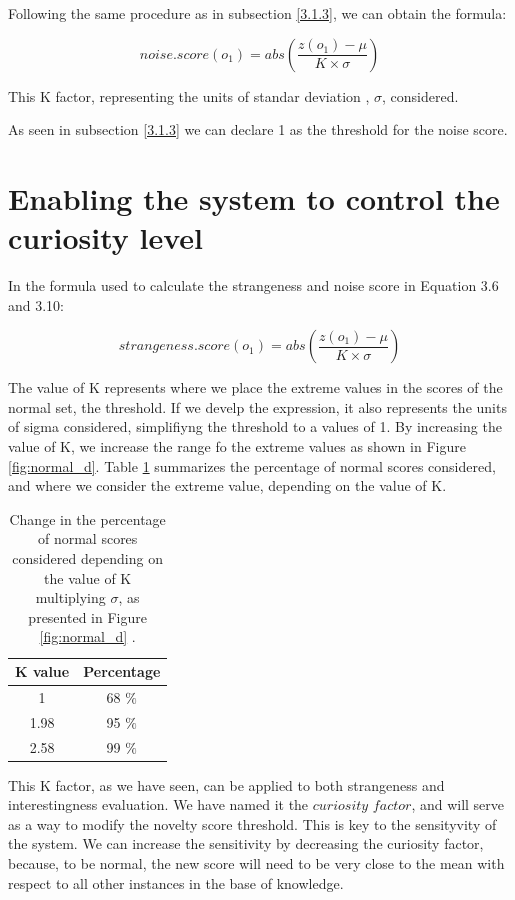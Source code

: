 Following the same procedure as in subsection \ref{3.1.3}, we can obtain the formula:

\begin{equation}
noise.score(o_1) = abs( \dfrac{z(o_1) - \mu}{ K \times \sigma})
\end{equation}

This K factor, representing the units of standar deviation , $\sigma$, considered.

As seen in subsection \ref{3.1.3} we can declare 1 as the threshold for the noise score.

\section{Enabling the system to control the curiosity level} \label{3.3}

In the formula used to calculate the strangeness and noise score in Equation 3.6 and 3.10:

\begin{equation}
strangeness.score(o_1) = abs( \dfrac{z(o_1) - \mu}{ K \times \sigma})
\end{equation}

The value of K represents where we place the extreme values in the scores of the normal set, the threshold. If we develp the expression, it also represents the units of sigma considered, simplifiyng the threshold to a values of 1. By increasing the value of K, we increase the range fo the extreme values as shown in Figure \ref{fig:normal_d}. Table \ref{tab:sigma} summarizes the percentage of normal scores considered, and where we consider the extreme value, depending on the value of K.

\begin{table}[h]
    \begin{tabular}{ c  c }
    K value & Percentage \\ \hline
    1 & 68 $ \% $ \\ 
    1.98 & 95 $ \% $ \\ 
    2.58 & 99 $ \% $ \\ 
    \end{tabular}
    \centering
    \caption[Change in the percentage of normal scores considered depending on the value of K multiplying $\sigma$]{Change in the percentage of normal scores considered depending on the value of K multiplying $\sigma$, as presented in Figure \ref{fig:normal_d} \label{tab:sigma}.}
\end{table}


This K factor, as we have seen, can be applied to both strangeness and interestingness evaluation. We have named it the $curiosity$ $ factor$, and will serve as a way to modify the novelty score threshold. This is key to the sensityvity of the system. We can increase the sensitivity by decreasing the curiosity factor, because, to be normal, the new score will need to be very close to the mean with respect to all other instances in the base of knowledge.

